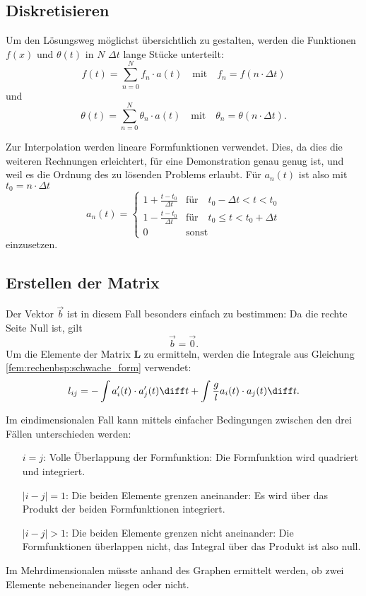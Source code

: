 \subsection{Diskretisieren}
Um den Lösungsweg möglichst übersichtlich zu gestalten, werden die Funktionen $f(x)$ und $\theta(t)$ in $N$ $\Delta t$ lange Stücke unterteilt:
\begin{equation}
    f(t) = \sum_{n=0}^{N} f_n \cdot a(t) \quad
    \text{mit} \quad
    f_n = f(n \cdot \Delta t)
\end{equation}
und
\begin{equation}
    \theta(t) = \sum_{n=0}^{N} \theta_n \cdot a(t) \quad
    \text{mit} \quad
    \theta_n = \theta(n \cdot \Delta t).
\end{equation}

Zur Interpolation werden lineare Formfunktionen verwendet.
Dies, da dies die weiteren Rechnungen erleichtert, für eine Demonstration genau genug ist, und weil es die Ordnung des zu lösenden Problems erlaubt.
Für $a_n(t)$ ist also mit $t_0 = n \cdot \Delta t$
\begin{equation}
    a_n(t) = \left\{ \begin{array}{ll}
        1+\frac{t-t_0}{\Delta t} & \text{für} \quad t_0 - \Delta t < t < t_0 \\
        1-\frac{t-t_0}{\Delta t} & \text{für} \quad t_0 \leq t < t_0 + \Delta t \\
        0 & \text{sonst}
    \end{array} \right.
\end{equation}
einzusetzen.


\subsection{Erstellen der Matrix}
Der Vektor $\vec{b}$ ist in diesem Fall besonders einfach zu bestimmen: Da die rechte Seite Null ist, gilt
\begin{equation}
    \vec{b} = \vec{0}.
\end{equation}
Um die Elemente der Matrix $\mathbf{L}$ zu ermitteln, werden die Integrale aus Gleichung \ref{fem:rechenbsp:schwache_form} verwendet:
\begin{equation}
    l_{ij} = - \int a_i'(t) \cdot a_j'(t) \diff t + \int \frac{g}{l} a_i(t) \cdot a_j(t) \diff t.
\end{equation}

Im eindimensionalen Fall kann mittels einfacher Bedingungen zwischen den drei Fällen unterschieden werden:
\begin{itemize}
    \item[$i = j$:] Volle Überlappung der Formfunktion: Die Formfunktion wird quadriert und integriert. 
    \item[$|i - j| = 1$:] Die beiden Elemente grenzen aneinander: Es wird über das Produkt der beiden Formfunktionen integriert.
    \item[$|i - j| > 1$:] Die beiden Elemente grenzen nicht aneinander: Die Formfunktionen überlappen nicht, das Integral über das Produkt ist also null.
\end{itemize}
Im Mehrdimensionalen müsste anhand des Graphen ermittelt werden, ob zwei Elemente nebeneinander liegen oder nicht.

